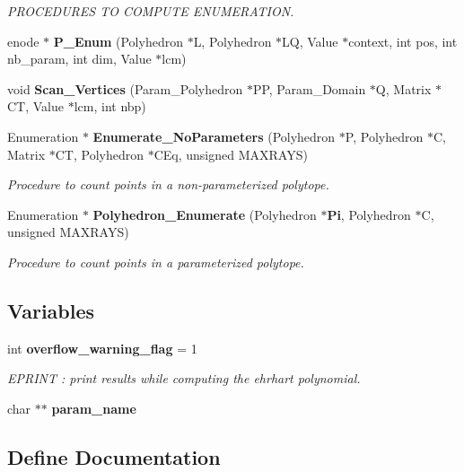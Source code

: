 \begin{CompactItemize}
\begin{CompactList}\small\item\em PROCEDURES TO COMPUTE ENUMERATION.\item\end{CompactList}\item 
enode $\ast$ {\bf P\_\-Enum} (Polyhedron $\ast$L, Polyhedron $\ast$LQ, Value $\ast$context, int pos, int nb\_\-param, int dim, Value $\ast$lcm)
\item 
void {\bf Scan\_\-Vertices} (Param\_\-Polyhedron $\ast$PP, Param\_\-Domain $\ast$Q, Matrix $\ast$CT, Value $\ast$lcm, int nbp)
\item 
Enumeration $\ast$ {\bf Enumerate\_\-No\-Parameters} (Polyhedron $\ast$P, Polyhedron $\ast$C, Matrix $\ast$CT, Polyhedron $\ast$CEq, unsigned MAXRAYS)
\begin{CompactList}\small\item\em Procedure to count points in a non-parameterized polytope.\item\end{CompactList}\item 
Enumeration $\ast$ {\bf Polyhedron\_\-Enumerate} (Polyhedron $\ast${\bf Pi}, Polyhedron $\ast$C, unsigned MAXRAYS)
\begin{CompactList}\small\item\em Procedure to count points in a parameterized polytope.\item\end{CompactList}\end{CompactItemize}
\subsection*{Variables}
\begin{CompactItemize}
\item 
int {\bf overflow\_\-warning\_\-flag} = 1
\begin{CompactList}\small\item\em EPRINT : print results while computing the ehrhart polynomial.\item\end{CompactList}\item 
char $\ast$$\ast$ {\bf param\_\-name}
\end{CompactItemize}


\subsection{Define Documentation}
